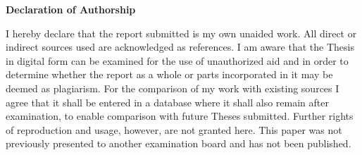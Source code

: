 \documentclass[12pt]{article}
\begin{document}
\RaggedRight


\newpage


\Large
\noindent
\textbf{Declaration of Authorship} 
\vspace{0.5cm}
\noindent
\normalsize

I hereby declare that the report submitted is my own unaided work. All direct or 
indirect sources used are acknowledged as references. I am aware that the Thesis 
in digital form can be examined for the use of unauthorized aid and in order to 
determine whether the report as a whole or parts incorporated in it may be 
deemed as plagiarism. For the comparison of my work with existing sources I 
agree that it shall be entered in a database where it shall also remain after 
examination, to enable comparison with future Theses submitted. Further rights 
of reproduction and usage, however, are not granted here. This paper was not 
previously presented to another examination board and has not been published. 

\end{document}
